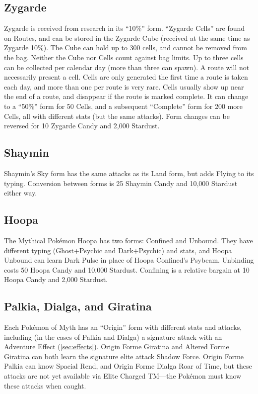 \subsection{Zygarde\label{sec:zygarde}}
Zygarde is received from research in its ``10\%'' form.
``Zygarde Cells'' are found on Routes, and can be stored in the Zygarde Cube
 (received at the same time as Zygarde 10\%).
The Cube can hold up to 300 cells, and cannot be removed from the bag.
Neither the Cube nor Cells count against bag limits.
Up to three cells can be collected per calendar day (more than three can spawn).
A route will not necessarily present a cell.
Cells are only generated the first time a route is taken each day, and more than one per route is very rare.
Cells usually show up near the end of a route, and disappear if the route is marked complete.
It can change to a ``50\%'' form for 50 Cells, and a subsequent ``Complete''
 form for 200 more Cells, all with different stats (but the same attacks).
Form changes can be reversed for 10 Zygarde Candy and 2,000 Stardust.

\subsection{Shaymin}
Shaymin's Sky form has the same attacks as its Land form, but adds Flying to its typing.
Conversion between forms is 25 Shaymin Candy and 10,000 Stardust either way.

\subsection{Hoopa\label{subsec:hoopa}}
The Mythical Pokémon Hoopa has two forms: Confined and Unbound.
They have different typing (Ghost+Psychic and Dark+Psychic) and stats,
  and Hoopa Unbound can learn Dark Pulse in place of Hoopa Confined's Psybeam.
Unbinding costs 50 Hoopa Candy and 10,000 Stardust.
Confining is a relative bargain at 10 Hoopa Candy and 2,000 Stardust.

\subsection{Palkia, Dialga, and Giratina}
Each Pokémon of Myth has an ``Origin'' form with different stats and attacks, including
 (in the cases of Palkia and Dialga) a signature attack with an Adventure Effect (\autoref{sec:effects}).
Origin Forme Giratina and Altered Forme Giratina can both learn the signature elite attack Shadow Force.
Origin Forme Palkia can know Spacial Rend, and Origin Forme Dialga Roar of Time, but these
 attacks are not yet available via Elite Charged TM---the Pokémon must know these
 attacks when caught.

